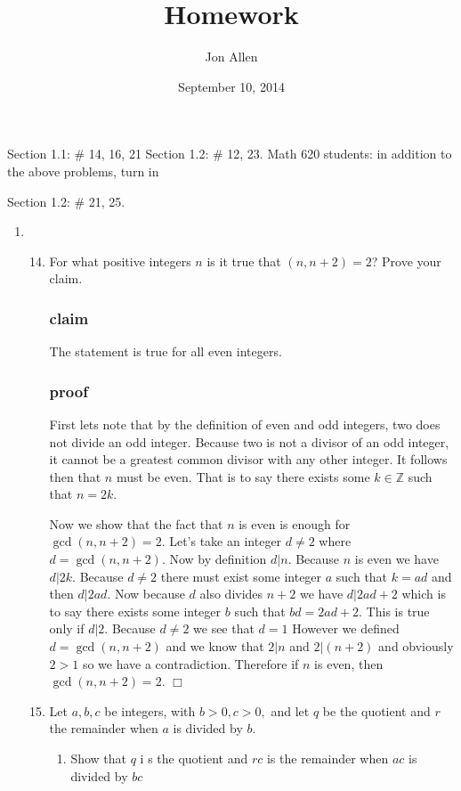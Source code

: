\documentclass[letterpaper]{article}
\begin{document}
\title{Homework}
\date{September 10, 2014}
\author{Jon Allen}
\maketitle
Section 1.1: \# 14, 16, 21
Section 1.2: \# 12, 23.
Math 620 students: in addition to the above problems, turn in

Section 1.2: \# 21, 25.
\renewcommand{\labelenumi}{1.\arabic{enumi}}
\renewcommand{\labelenumii}{\arabic{enumii}.}
\renewcommand{\labelenumiii}{(\alph{enumiii})}
\begin{enumerate}
\item
\begin{enumerate}
\setcounter{enumii}{13}
\item
For what positive integers $n$ is it true that $(n,n+2)=2$? Prove your claim.
\subsubsection*{claim}
The statement is true for all even integers.
\subsubsection*{proof}
First lets note that by the definition of even and odd integers, two does not divide an odd integer. Because two is not a divisor of an odd integer, it cannot be a greatest common divisor with any other integer. It follows then that $n$ must be even. That is to say there exists some $k\in\mathbb{Z}$ such that $n=2k$.

Now we show that the fact that $n$ is even  is enough for $\gcd(n,n+2)=2$. Let's take an integer $d\ne 2$ where $d=\gcd(n,n+2)$. Now by definition $d|n$. Because $n$ is even we have $d|2k$. Because $d\ne2$ there must exist some integer $a$ such that $k=ad$ and then $d|2ad$. Now because $d$ also divides $n+2$ we have $d|2ad+2$ which is to say there exists some integer $b$ such that $bd=2ad+2$. This is true only if $d|2$. Because $d\ne2$ we see that $d=1$ However we defined $d=\gcd(n,n+2)$ and we know that $2|n$ and $2|(n+2)$ and obviously $2>1$ so we have a contradiction. Therefore if $n$ is even, then $\gcd(n,n+2)=2$. $\Box$
\setcounter{enumii}{15}
\item
Let $a,b,c$ be integers, with $b>0, c>0,$ and let $q$ be the quotient and $r$ the remainder when $a$ is divided by $b$.
\begin{enumerate}
\item
Show that $q$ i s the quotient and $rc$ is the remainder when $ac$ is divided by $bc$


\end{enumerate}
\end{enumerate}
\end{enumerate}
\end{document}
